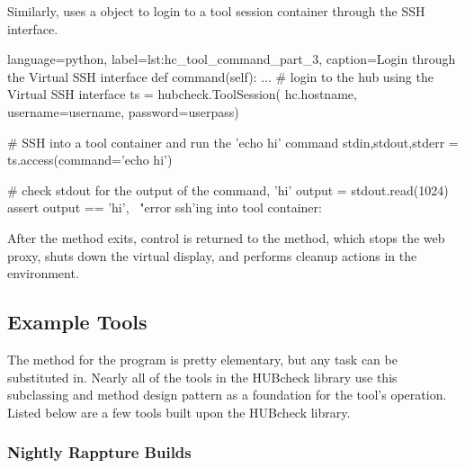 \noindent
Similarly,  uses a 
object to login to a tool session container through the SSH interface.

\begin{xcode}{%
  language=python,%
  label=lst:hc_tool_command_part_3,%
  caption={Login through the Virtual SSH interface}%
}
    def command(self):
        ...
        # login to the hub using the Virtual SSH interface
        ts = hubcheck.ToolSession(
              hc.hostname, username=username, password=userpass)

        # SSH into a tool container and run the 'echo hi' command
        stdin,stdout,stderr = ts.access(command='echo hi')

        # check stdout for the output of the command, 'hi'
        output = stdout.read(1024)
        assert output == 'hi\n', \
            "error ssh'ing into tool container: %
\end{xcode}


After the  method exits, control is returned to the
\xfmethod{run()} method, which stops the web proxy, shuts down the virtual
display, and performs cleanup actions in the environment.




\subsection{Example Tools}
\label{ssec:hubcheck_tools_examples}


The  method for the  program is
pretty elementary, but any task can be substituted in. Nearly all of the tools
in the HUBcheck library use this subclassing and \xfmethod{command()} method
design pattern as a foundation for the tool's operation. Listed below are a few
tools built upon the HUBcheck library.

\subsubsection{Nightly Rappture Builds}
\label{sssec:hubcheck_tools_examples_hcnrb}

